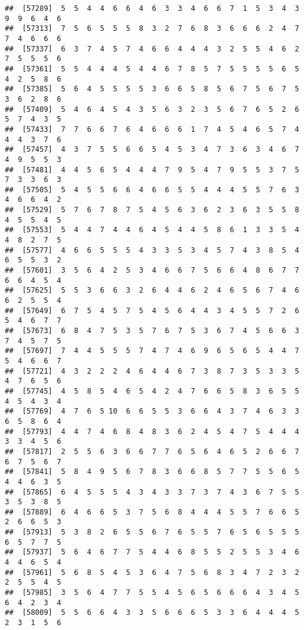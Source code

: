 \documentclass[
]{book}
\begin{document}
\begin{verbatim}
##  [57289]  5  5  4  4  6  6  4  6  3  3  4  6  6  7  1  5  3  4  3  9  9  6  4  6
##  [57313]  7  5  6  5  5  5  8  3  2  7  6  8  3  6  6  6  2  4  7  7  4  6  6  6
##  [57337]  6  3  7  4  5  7  4  6  6  4  4  4  3  2  5  5  4  6  2  7  5  5  5  6
##  [57361]  5  5  4  4  4  5  4  4  6  7  8  5  7  5  5  5  5  6  5  4  2  5  8  6
##  [57385]  5  6  4  5  5  5  5  3  6  6  5  8  5  6  7  5  6  7  5  3  6  2  8  6
##  [57409]  5  4  6  4  5  4  3  5  6  3  2  3  5  6  7  6  5  2  6  5  7  4  3  5
##  [57433]  7  7  6  6  7  6  4  6  6  6  1  7  4  5  4  6  5  7  4  4  4  3  7  6
##  [57457]  4  3  7  5  5  6  6  5  4  5  3  4  7  3  6  3  4  6  7  4  9  5  5  3
##  [57481]  4  4  5  6  5  4  4  4  7  9  5  4  7  9  5  5  3  7  5  7  3  3  6  3
##  [57505]  5  4  5  5  6  6  4  6  6  5  5  4  4  4  5  5  7  6  3  4  6  6  4  2
##  [57529]  5  7  6  7  8  7  5  4  5  6  3  6  2  3  6  3  5  5  8  4  5  5  4  5
##  [57553]  5  4  4  7  4  4  6  4  5  4  4  5  8  6  1  3  3  5  4  4  8  2  7  5
##  [57577]  4  6  6  5  5  5  4  3  3  5  3  4  5  7  4  3  8  5  4  6  5  5  3  2
##  [57601]  3  5  6  4  2  5  3  4  6  6  7  5  6  6  4  8  6  7  7  6  6  4  5  4
##  [57625]  5  5  3  6  6  3  2  6  4  4  6  2  4  6  5  6  7  4  6  6  2  5  5  4
##  [57649]  6  7  5  4  5  7  5  4  5  6  4  4  3  4  5  5  7  2  6  5  4  6  7  7
##  [57673]  6  8  4  7  5  3  5  7  6  7  5  3  6  7  4  5  6  6  3  7  4  5  7  5
##  [57697]  7  4  4  5  5  5  7  4  7  4  6  9  6  5  6  5  4  4  7  5  4  6  6  7
##  [57721]  4  3  2  2  2  4  6  4  4  6  7  3  8  7  3  5  3  3  5  4  7  6  5  6
##  [57745]  4  5  8  5  4  6  5  4  2  4  7  6  6  5  8  3  6  5  5  4  5  4  3  4
##  [57769]  4  7  6  5 10  6  6  5  5  3  6  6  4  3  7  4  6  3  3  6  5  8  6  4
##  [57793]  4  4  7  4  6  8  4  8  3  6  2  4  5  4  7  5  4  4  4  3  3  4  5  6
##  [57817]  2  5  5  6  3  6  6  7  7  6  5  6  4  6  5  2  6  6  7  6  7  5  6  7
##  [57841]  5  8  4  9  5  6  7  8  3  6  6  8  5  7  7  5  5  6  5  4  4  6  3  5
##  [57865]  6  4  5  5  5  4  3  4  3  3  7  3  7  4  3  6  7  5  5  3  5  3  8  5
##  [57889]  6  4  6  6  5  3  7  5  6  8  4  4  4  5  5  7  6  6  5  2  6  6  5  3
##  [57913]  5  3  8  2  6  5  5  6  7  6  5  5  7  6  5  6  5  5  5  6  5  7  7  5
##  [57937]  5  6  4  6  7  7  5  4  4  6  8  5  5  2  5  5  3  4  6  4  4  6  5  4
##  [57961]  5  6  8  5  4  5  3  6  4  7  5  6  8  3  4  7  2  3  2  2  5  5  4  5
##  [57985]  3  5  6  4  7  7  5  5  4  5  6  5  6  6  6  4  3  4  5  6  4  2  3  4
##  [58009]  5  5  6  6  4  3  3  5  6  6  6  5  3  3  6  4  4  4  5  2  3  1  5  6

\end{verbatim}
\end{document}
